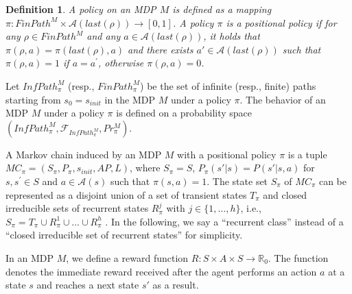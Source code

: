 \documentclass[letterpaper, 10 pt, conference]{ieeeconf}  %
\newtheorem{definition}{Definition}
\begin{document}
\begin{definition}
  A policy on an MDP $M$ is defined as a mapping $\pi:FinPath^{M} \times \mathcal{A}(last(\rho)) \rightarrow [0,1]$. A policy $\pi$ is a {\it positional} policy if for any $ \rho \in FinPath^{M}$ and any $ a \in \mathcal{A}(last(\rho))$, it holds that $\pi(\rho, a)=\pi(last(\rho),a)$ and there exists $ a' \in \mathcal{A}(last(\rho))$ such that $\pi(\rho, a) = 1$ if $a=a^{\prime}$, otherwise $\pi(\rho, a) = 0$.

\end{definition}

Let $InfPath^{M}_{\pi}$ (resp., $FinPath^{M}_{\pi}$) be the set of infinite (resp., finite) paths starting from $s_0=s_{init}$ in the MDP $M$ under a policy $\pi$. The behavior of an MDP $M$ under a policy $\pi$ is defined on a probability space $(InfPath^{M}_{\pi}, \mathcal{F}_{InfPath^{M}_{\pi}}, Pr^{M}_{\pi})$. %

A Markov chain induced by an MDP $M$ with a positional policy $\pi$ is a tuple $MC_{\pi} = (S_{\pi},P_{\pi},s_{init},AP,L)$, where $S_{\pi} = S$, $P_{\pi}(s'|s) = P(s'|s,a)$ for $s, s^{\prime} \in S$ and $a \in \mathcal{A}(s)$ such that $\pi(s,a) = 1$.
The state set $S_{\pi}$ of $MC_{\pi}$ can be represented as a disjoint union of a set of transient states $T_{\pi}$ and closed irreducible sets of recurrent states $R^j_{\pi}$ with $j \in \{ 1, \ldots ,h \}$, i.e., $ S_{\pi} = T_{\pi} \cup R^1_{\pi} \cup \ldots \cup R^h_{\pi} $ \cite{ESS}.
In the following, we say a ``recurrent class'' instead of a ``closed irreducible set of recurrent states'' for simplicity.

In an MDP $M$, we define a reward function $R:S \times A \times S \rightarrow \mathbb{R}_{0}$. The function denotes the immediate reward received after the agent performs an action $a$ at a state $s$ and reaches a next state $s'$ as a result.
\end{document}
